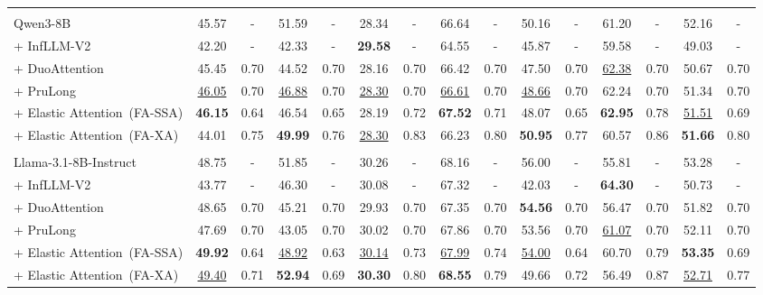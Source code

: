 \begin{table}[t]
{\begin{tabular}{l | cc | cc | cc | cc | cc | cc | cc}
\arrayrulecolor{black}
\midrule
\rowcolor{blue!25}
\multicolumn{15}{c}{\textbf{Qwen3-8B backbone model}} \\
\arrayrulecolor{black!20}\midrule
Qwen3-8B & 45.57 & - & 51.59 & - & 28.34 & - & 66.64 & - & 50.16 & - & 61.20 & - & 52.16 & - \\
+ InfLLM-V2 & 42.20 & - & 42.33 & - & \textbf{29.58} & - & 64.55 & - & 45.87 & - & 59.58 & - & 49.03 & - \\
+ DuoAttention & 45.45 & 0.70 & 44.52 & 0.70 & 28.16 & 0.70 & 66.42 & 0.70 & 47.50 & 0.70 & \underline{62.38} & 0.70 & 50.67 & 0.70 \\
+ PruLong & \underline{46.05} & 0.70 & \underline{46.88} & 0.70 & \underline{28.30} & 0.70 & \underline{66.61} & 0.70 & \underline{48.66} & 0.70 & 62.24 & 0.70 & 51.34 & 0.70 \\
\arrayrulecolor{black!40}\midrule
+ Elastic Attention~(FA-SSA)& \textbf{46.15} & 0.64 & 46.54 & 0.65 & 28.19 & 0.72 & \textbf{67.52} & 0.71 & 48.07 & 0.65 & \textbf{62.95} & 0.78 & \underline{51.51} & 0.69 \\
+ Elastic Attention~(FA-XA)& 44.01 & 0.75 & \textbf{49.99} & 0.76 & \underline{28.30} & 0.83 & 66.23 & 0.80 & \textbf{50.95} & 0.77 & 60.57 & 0.86 & \textbf{51.66} & 0.80 \\

\arrayrulecolor{black}
\midrule
\rowcolor{cyan!20}
\multicolumn{15}{c}{\textbf{Llama-3.1-8B-Instruct backbone model}} \\
\arrayrulecolor{black!20}\midrule
Llama-3.1-8B-Instruct & 48.75 & - & 51.85 & - & 30.26 & - & 68.16 & - & 56.00 & - & 55.81 & - & 53.28 & - \\
+ InfLLM-V2 & 43.77 & - & 46.30 & - & 30.08 & - & 67.32 & - & 42.03 & - & \textbf{64.30} & - & 50.73 & - \\
+ DuoAttention & 48.65 & 0.70 & 45.21 & 0.70 & 29.93 & 0.70 & 67.35 & 0.70 & \textbf{54.56} & 0.70 & 56.47 & 0.70 & 51.82 & 0.70 \\
+ PruLong & 47.69 & 0.70 & 43.05 & 0.70 & 30.02 & 0.70 & 67.86 & 0.70 & 53.56 & 0.70 & \underline{61.07} & 0.70 & 52.11 & 0.70 \\
\arrayrulecolor{black!40}\midrule
+ Elastic Attention~(FA-SSA)& \textbf{49.92} & 0.64 & \underline{48.92} & 0.63 & \underline{30.14} & 0.73 & \underline{67.99} & 0.74 & \underline{54.00} & 0.64 & 60.70 & 0.79 & \textbf{53.35} & 0.69 \\
+ Elastic Attention~(FA-XA)& \underline{49.40} & 0.71 & \textbf{52.94} & 0.69 & \textbf{30.30} & 0.80 & \textbf{68.55} & 0.79 & 49.66 & 0.72 & 56.49 & 0.87 & \underline{52.71} & 0.77 \\


\end{tabular}}
\end{table}
